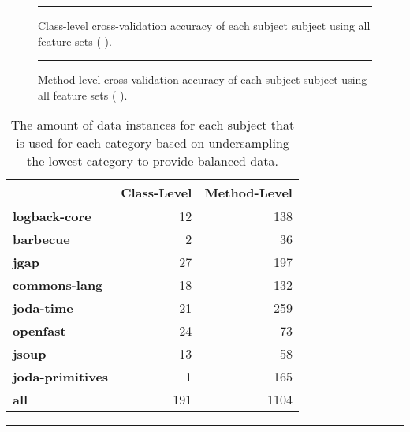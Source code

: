 \begin{figure}[!ht]
  \centering
  \begin{adjustbox}{max size={.95\textwidth}{.95\textheight}}
    
  \end{adjustbox}
  \caption{Class-level cross-validation accuracy of each subject subject using all feature sets (   ).}
  \vspace{1mm}
  \footnotesize{\emph{}}
  \vspace{2mm}
  \hrule
  \label{fig:individual_cross_validation_class_1_2_3_4_graph}
\end{figure}

\begin{figure}[ht!]
  \centering
  \begin{adjustbox}{max size={.95\textwidth}{.95\textheight}}
    
  \end{adjustbox}
  \caption{Method-level cross-validation accuracy of each subject subject using all feature sets (   ).}
  \vspace{1mm}
  \footnotesize{\emph{}}
  \vspace{2mm}
  \hrule
  \label{fig:individual_cross_validation_method_1_2_3_4_graph}
\end{figure}

\begin{table}[!ht]
  \centering
  \begin{threeparttable}
    \begin{tabular}{|l|r|r|}
      \rowcolor[RGB]{169,196,223}
      \hline & \textbf{Class-Level} & \textbf{Method-Level} \\
      \hline \cellcolor[RGB]{169,196,223} \textbf{logback-core} & 12 & 138 \\
      \hline \cellcolor[RGB]{169,196,223} \textbf{barbecue} & 2 & 36 \\
      \hline \cellcolor[RGB]{169,196,223} \textbf{jgap} & 27 & 197 \\
      \hline \cellcolor[RGB]{169,196,223} \textbf{commons-lang} & 18 & 132 \\
      \hline \cellcolor[RGB]{169,196,223} \textbf{joda-time} & 21 & 259 \\
      \hline \cellcolor[RGB]{169,196,223} \textbf{openfast} & 24 & 73 \\
      \hline \cellcolor[RGB]{169,196,223} \textbf{jsoup} & 13 & 58 \\
      \hline \cellcolor[RGB]{169,196,223} \textbf{joda-primitives} & 1 & 165 \\
      \hline \cellcolor[RGB]{169,196,223} \textbf{all} & 191 & 1104 \\
      \hline
    \end{tabular}
  \end{threeparttable}
  \caption{The amount of data instances for each subject that is used for each category based on undersampling the lowest category to provide balanced data.}
  \vspace{2mm}
  \hrule
  \label{tab:experiments_undersampled_data}
\end{table}

